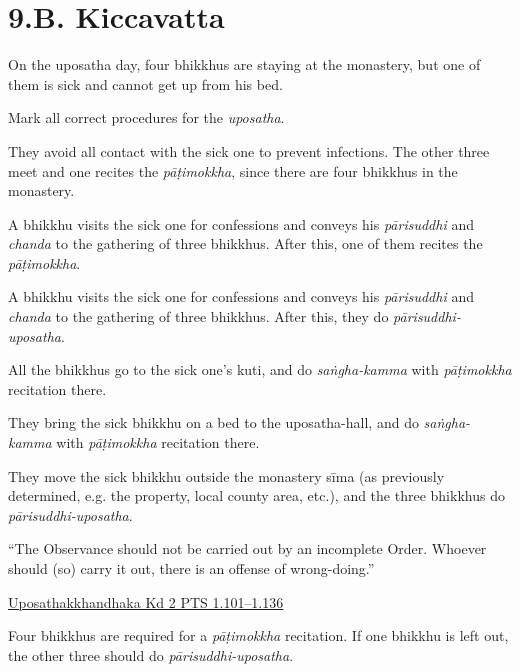 \chapter{9.B. Kiccavatta}
\renewcommand*{\theChapterTitle}{9.B. Kiccavatta}

\begin{exam}{\autoExamName}

\begin{problem}

  On the uposatha day, four bhikkhus are staying at the monastery, but one of
  them is sick and cannot get up from his bed.

  Mark all correct procedures for the \emph{uposatha}.

  \bigskip

  \begin{manswers}{1}
    \bChoices

     They avoid all contact with the sick one to prevent infections. The
    other three meet and one recites the \emph{pāṭimokkha}, since there are four
    bhikkhus in the monastery.\eAns

     A bhikkhu visits the sick one for confessions and conveys his
    \emph{pārisuddhi} and \emph{chanda} to the gathering of three bhikkhus.
    After this, one of them recites the \emph{pāṭimokkha}.\eAns

     A bhikkhu visits the sick one for confessions and conveys his
    \emph{pārisuddhi} and \emph{chanda} to the gathering of three bhikkhus.
    After this, they do \emph{pārisuddhi-uposatha}.\eAns

     All the bhikkhus go to the sick one's kuti, and do \emph{saṅgha-kamma}
    with \emph{pāṭimokkha} recitation there.\eAns

     They bring the sick bhikkhu on a bed to the uposatha-hall, and do
    \emph{saṅgha-kamma} with \emph{pāṭimokkha} recitation there.\eAns

     They move the sick bhikkhu outside the monastery sīma (as previously
    determined, e.g. the property, local county area, etc.), and the three
    bhikkhus do \emph{pārisuddhi-uposatha}.\eAns

    \eChoices
  \end{manswers}

  \begin{solution}
    ``The Observance should not be carried out by an incomplete Order. Whoever
    should (so) carry it out, there is an offense of wrong-doing.''

    \href{https://suttacentral.net/pli-tv-kd2/en/horner-brahmali}{Uposathakkhandhaka Kd 2 PTS 1.101–1.136}

    Four bhikkhus are required for a \emph{pāṭimokkha} recitation. If one
    bhikkhu is left out, the other three should do \emph{pārisuddhi-uposatha}.
  \end{solution}

\end{problem}

\end{exam}
